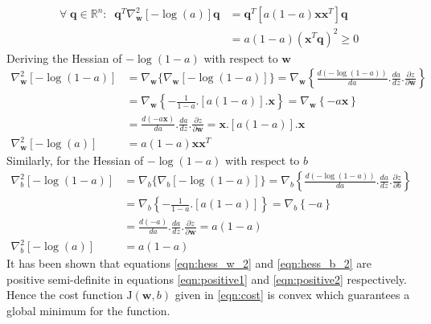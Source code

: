 \documentclass[12pt]{report}
\numberwithin{equation}{section}
\begin{document}
\begin{equation}\label{eqn:positive2}
\begin{split}
\forall \; \bm{q}\in \mathbb{R}^n: \;\; \bm{q}^T \nabla_{\bm{w}}^2[-\log(a)] \bm{q} & =  \bm{q}^T \left[ a(1-a)\bm{x}\bm{x}^T \right] \bm{q} \\ 
& =  a (1 - a) (\bm{x}^T \bm{q})^2 \geq 0 
\end{split}
\end{equation}
Deriving the Hessian of $-\log(1-a)$ with respect to $\bm{w}$
\begin{equation}\label{eqn:hess_w_2}
\begin{split}
\nabla^2_{\bm{w}}[-\log (1-a)] &= \nabla_{\bm{w}}\{\nabla_{\bm{w}}[-\log (1-a)]\} = \nabla_{\bm{w}}\left\{\frac{d(-\log (1-a))}{da}.\frac{da}{dz}.\frac{\partial z}{\partial \bm{w}} \right\} \\
	&=\nabla_{\bm{w}}\left\{ -\frac{1}{1-a}.[a(1-a)].\bm{x} \right\} = \nabla_{\bm{w}}\left\{ -a\bm{x} \right\} \\
	&= \frac{d(-a\bm{x})}{da}.\frac{da}{dz}.\frac{\partial z}{\partial \bm{w}} = \bm{x}.[a(1-a)].\bm{x} \\
\nabla^2_{\bm{w}}[-\log (a)] &= a(1-a)\bm{x}\bm{x}^T	
\end{split}
\end{equation}
Similarly, for the Hessian of $-\log(1-a)$ with respect to $b$ 
\begin{equation}\label{eqn:hess_b_2}
\begin{split}
\nabla^2_b[-\log (1-a)] &= \nabla_b\{\nabla_b[-\log (1-a)]\} = \nabla_b\left\{\frac{d(-\log (1-a))}{da}.\frac{da}{dz}.\frac{\partial z}{\partial b} \right\} \\
	&=\nabla_b\left\{ -\frac{1}{1-a}.[a(1-a)] \right\} = \nabla_b\left\{ -a \right\} \\
	&= \frac{d(-a)}{da}.\frac{da}{dz}.\frac{\partial z}{\partial \bm{w}} = a(1-a) \\
\nabla^2_b[-\log (a)] &= a(1-a)	
\end{split}
\end{equation}
It has been shown that equations \eqref{eqn:hess_w_2} and \eqref{eqn:hess_b_2} are positive semi-definite in equations \eqref{eqn:positive1} and \eqref{eqn:positive2} respectively. Hence the cost function $\mathrm{J}(\bm{w},b)$ given in \eqref{eqn:cost} is convex which guarantees a global minimum for the function.
\end{document}
